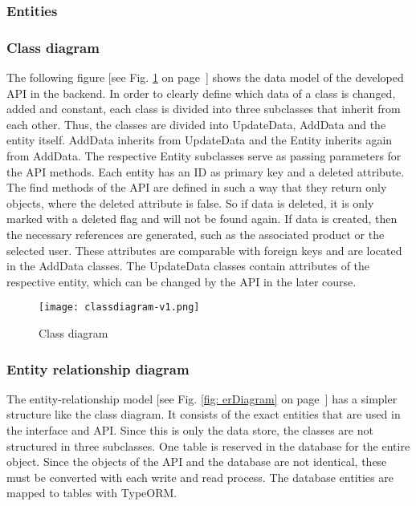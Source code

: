     \subsubsection*{Entities}

    \subsubsection*{Class diagram}
    The following figure [see Fig. \ref{fig: classdiagram} on page~\pageref{fig: classdiagram}] shows the data model of the developed API in the backend. In order to clearly define which data of a class is changed, added and constant, each class is divided into three subclasses that inherit from each other. Thus, the classes are divided into UpdateData, AddData and the entity itself. AddData inherits from UpdateData and the Entity inherits again from AddData. The respective Entity subclasses serve as passing parameters for the API methods. Each entity has an ID as primary key and a deleted attribute. The find methods of the API are defined in such a way that they return only objects, where the deleted attribute is false. So if data is deleted, it is only marked with a deleted flag and will not be found again. If data is created, then the necessary references are generated, such as the associated product or the selected user. These attributes are comparable with foreign keys and are located in the AddData classes. The UpdateData classes contain attributes of the respective entity, which can be changed by the API in the later course. 

    \begin{figure}[h]
        \centering
        \texttt{[image: classdiagram-v1.png]}
        \caption{Class diagram}
        \label{fig: classdiagram}
    \end{figure}


    \subsubsection*{Entity relationship diagram}
    The entity-relationship model [see Fig. \ref{fig: erDiagram} on page~\pageref{fig: erDiagram}] has a simpler structure like the class diagram. It consists of the exact entities that are used in the interface and API. Since this is only the data store, the classes are not structured in three subclasses. One table is reserved in the database for the entire object. Since the objects of the API and the database are not identical, these must be converted with each write and read process. The database entities are mapped to tables with TypeORM. 

